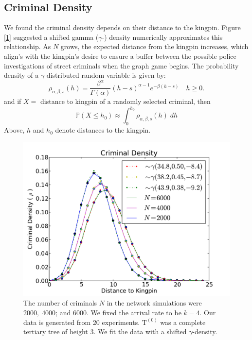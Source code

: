 \documentclass[11pt]{article}
\renewcommand{\t }[1]{\mathrm{#1}}
\newcommand{\bb}[1]{\mathbb{#1}}
\theoremstyle{plain}
\theoremstyle{definition}
\begin{document}
\subsection*{Criminal Density}

We found the criminal density depends on their distance to the kingpin.  Figure [\ref{nd}] suggested a shifted gamma ($\gamma$-) density numerically approximates this relationship.  As $N$ grows, the expected distance from the kingpin increases, which align's with the kingpin's desire to ensure a buffer between the possible police investigations of street criminals when the graph game begins.  The probability density of a $\gamma$-distributed random variable is given by:
$$
\rho_{\alpha, \beta, s}(h) = \frac{\beta^\alpha}{\Gamma(\alpha)}(h - s)^{\alpha-1}e^{ -\beta (h-s)}\quad h \geq 0.
$$
and if $X=$ distance to kingpin of a randomly selected criminal, then
$$
\bb P(X \leq h_0) \approx \int_{0}^{h_0}\rho_{\alpha, \beta, s}(h) \; dh
$$
Above, $h$ and $h_0$ denote distances to the kingpin.

\begin{figure}
\centering
\includegraphics[width=0.75\linewidth]{nodedensity.pdf}
\caption{The number of criminals $N$ in the network simulations were $2000, \; 4000$; and $6000$.  We fixed the arrival rate to be $k = 4$.  Our data is generated from 20 experiments.  $\t T^{(0)}$ was a complete tertiary tree of height 3.  We fit the data with a shifted $\gamma$-density.}
\label{nd}
\end{figure}
\end{document}
